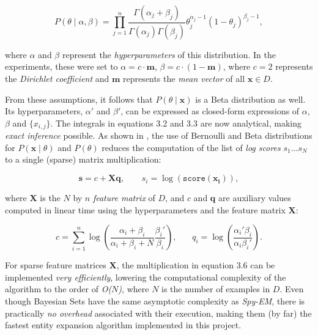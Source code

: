 \documentclass[12pt,twoside,notitlepage,amsart]{report} %
\begin{document}
	\begin{equation} \displaystyle P( \theta \mid \alpha, \beta) = \prod_{j=1}^{n}{ \frac{\Gamma(\alpha_j + \beta_j)}{\Gamma(\alpha_j)\Gamma(\beta_j)} \theta_j^{\alpha_j-1} (1-\theta_j)^{\beta_j - 1} },   \end{equation} 
	
	where $\alpha$ and $\beta$ represent the \emph{hyperparameters} of this distribution. In the experiments, these were set to $ \alpha = c \cdot \mathbf{m} $, $ \beta = c \cdot (1 -  \mathbf{m})$, where $c=2$ represents the \emph{Dirichlet coefficient} and $\mathbf{m}$ represents the \emph{mean vector} of all $\mathbf{x} \in D$.
	 
	From these assumptions, it follows that $P(\theta \mid \mathbf{x})$ is a Beta distribution as well. Its hyperparameters, $\alpha'$ and $\beta'$, can be expressed as closed-form expressions of $\alpha$, $\beta$ and $\{ x_{i,j} \}$. The integrals in equations 3.2 and 3.3 are now analytical, making \emph{exact inference} possible. As shown in \cite{Ghahramani06}, the use of Bernoulli and Beta distributions for $P( \mathbf{x} \mid \theta)$ and $P(\theta)$ reduces the computation of the list of \emph{log scores} $s_1 \ldots s_N$ to a single (sparse) matrix multiplication: %
	
	\begin{equation} \displaystyle \mathbf{s} = c + \mathbf{X} \mathbf{q}, ~~~~~~ \textit{            } s_i = \log(\texttt{score}(\mathbf{x_i})), \end{equation}
	
	where $\mathbf{X}$ is the $N$ by $n$ \emph{feature matrix} of $D$, and $c$ and $\mathbf{q}$ are auxiliary values computed in linear time using the hyperparameters and the feature matrix $\mathbf{X}$:
	
	\begin{equation} \displaystyle c = \sum_{i=1}^{n}{\log(\frac{\alpha_i + \beta_i}{\alpha_i + \beta_i + N}  \frac{\beta_{i}'}{\beta_{i}})}, ~~~~  ~~~~ q_i = \log( \frac{\alpha_i' \beta_i}{\alpha_i \beta_i'} ). \end{equation}
	
	For sparse feature matrices $\mathbf{X}$, the multiplication in equation 3.6 can be implemented \emph{very efficiently}, lowering the computational complexity of the algorithm to the order of \emph{O($N$)}, where $N$ is the number of examples in $D$. Even though Bayesian Sets have the same asymptotic complexity as \emph{Spy-EM}, there is practically \emph{no overhead} associated with their execution, making them (by far) the fastest entity expansion algorithm implemented in this project. 
	
\end{document}
